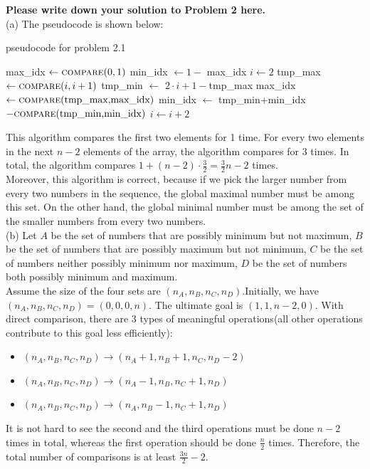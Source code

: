 \documentclass[11pt,twoside]{article}
\newenvironment{solution}{{\par\noindent\it Solution.}}{}
\begin{document}
\begin{solution}
\textbf{Please write down your solution to Problem 2 here.}\\
(a) The pseudocode is shown below:

\begin{algorithm}\label{2.1}
    \caption{pseudocode for problem 2.1}
    \begin{algorithmic}
        \State max\_idx $\gets \textsc{compare}(0,1)$
        \State min\_idx $\gets 1-$ max\_idx
        \State $i \gets 2$
            \State tmp\_max $\gets \textsc{compare}(i,i+1)$
            \State tmp\_min $\gets$ $2\cdot i+1-$tmp\_max
            \State max\_idx $\gets \textsc{compare}(\text{tmp\_max,max\_idx})$
            \State min\_idx $\gets$ tmp\_min+min\_idx $-\textsc{compare}(\text{tmp\_min,min\_idx})$
            \State $i \gets i+2$
        \EndWhile\\
    \end{algorithmic}
\end{algorithm}
This algorithm compares the first two elements for 1 time. 
For every two elements in the next $n-2$ elements of the array, the algorithm compares for 3 times.
In total, the algorithm compares $1+(n-2)\cdot \frac{3}{2}=\frac{3}{2}n-2$ times.\\
Moreover, this algorithm is correct, because if we pick the larger number from every two numbers in the sequence, 
the global maximal number must be among this set. On the other hand, the global minimal number must be among the set of the smaller numbers from every two numbers.
\vspace{0.45cm}\\
(b) Let $A$ be the set of numbers that are possibly minimum but not maximum, 
$B$ be the set of numbers that are possibly maximum but not minimum,
$C$ be the set of numbers neither possibly minimum nor maximum,
$D$ be the set of numbers both possibly minimum and maximum. \\
Assume the size of the four sets are $(n_A, n_B, n_C, n_D)$.Initially, we have $(n_A, n_B, n_C, n_D)=(0, 0, 0, n)$.
The ultimate goal is $(1, 1, n-2, 0)$. With direct comparison, there are 3 types of meaningful operations(all other operations contribute to this goal less efficiently): \\
\begin{itemize}
    \item $(n_A, n_B, n_C, n_D)\rightarrow(n_A+1, n_B+1, n_C, n_D-2)$
    \item $(n_A, n_B, n_C, n_D)\rightarrow(n_A-1, n_B, n_C+1, n_D)$
    \item $(n_A, n_B, n_C, n_D)\rightarrow(n_A, n_B-1, n_C+1, n_D)$
\end{itemize}
It is not hard to see the second and the third operations must be done $n-2$ times in total, 
whereas the first operation should be done $\frac{n}{2}$ times. 
Therefore, the total number of comparisons is at least $\frac{3n}{2} - 2$.

\end{solution}
\end{document}
